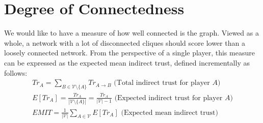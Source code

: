 \section{Degree of Connectedness}
  We would like to have a measure of how well connected is the graph. Viewed as a whole, a network with a lot of disconnected
  cliques should score lower than a loosely connected network. From the perspective of a single player, this measure can be
  expressed as the expected mean indirect trust, defined incrementally as follows:
  \begin{gather*}
    Tr_A = \sum\limits_{B \in \mathcal{V} \setminus \{A\}}Tr_{A \rightarrow B} \mbox{ (Total indirect trust for player
    }A\mbox{)} \\
    E\left[Tr_A\right] = \frac{Tr_A}{|\mathcal{V} \setminus \{A\}|} = \frac{Tr_A}{|\mathcal{V}| - 1} \mbox{ (Expected indirect
    trust for player }A\mbox{)} \\
    EMIT = \frac{1}{|\mathcal{V}|}\sum\limits_{A \in \mathcal{V}}E\left[Tr_A\right] \mbox{ (Expected mean indirect trust)}
  \end{gather*}
